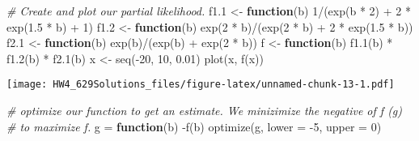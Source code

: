 \documentclass[
]{article}
\newenvironment{Shaded}{\begin{snugshade}}{\end{snugshade}}
\newcommand{\AttributeTok}[1]{\textcolor[rgb]{0.77,0.63,0.00}{#1}}
\newcommand{\CommentTok}[1]{\textcolor[rgb]{0.56,0.35,0.01}{\textit{#1}}}
\newcommand{\ControlFlowTok}[1]{\textcolor[rgb]{0.13,0.29,0.53}{\textbf{#1}}}
\newcommand{\DecValTok}[1]{\textcolor[rgb]{0.00,0.00,0.81}{#1}}
\newcommand{\FloatTok}[1]{\textcolor[rgb]{0.00,0.00,0.81}{#1}}
\newcommand{\FunctionTok}[1]{\textcolor[rgb]{0.00,0.00,0.00}{#1}}
\newcommand{\NormalTok}[1]{#1}
\newcommand{\OtherTok}[1]{\textcolor[rgb]{0.56,0.35,0.01}{#1}}
\newcommand{\SpecialCharTok}[1]{\textcolor[rgb]{0.00,0.00,0.00}{#1}}
\begin{document}
\begin{Shaded}
\begin{Highlighting}[]
\CommentTok{\# Create and plot our partial likelihood.}
\NormalTok{f1}\FloatTok{.1} \OtherTok{\textless{}{-}} \ControlFlowTok{function}\NormalTok{(b) }\DecValTok{1}\SpecialCharTok{/}\NormalTok{(}\FunctionTok{exp}\NormalTok{(b }\SpecialCharTok{*} \DecValTok{2}\NormalTok{) }\SpecialCharTok{+} \DecValTok{2} \SpecialCharTok{*} \FunctionTok{exp}\NormalTok{(}\FloatTok{1.5} \SpecialCharTok{*}\NormalTok{ b) }\SpecialCharTok{+} \DecValTok{1}\NormalTok{)}
\NormalTok{f1}\FloatTok{.2} \OtherTok{\textless{}{-}} \ControlFlowTok{function}\NormalTok{(b) }\FunctionTok{exp}\NormalTok{(}\DecValTok{2} \SpecialCharTok{*}\NormalTok{ b)}\SpecialCharTok{/}\NormalTok{(}\FunctionTok{exp}\NormalTok{(}\DecValTok{2} \SpecialCharTok{*}\NormalTok{ b) }\SpecialCharTok{+} \DecValTok{2} \SpecialCharTok{*} \FunctionTok{exp}\NormalTok{(}\FloatTok{1.5} \SpecialCharTok{*}\NormalTok{ b))}
\NormalTok{f2}\FloatTok{.1} \OtherTok{\textless{}{-}} \ControlFlowTok{function}\NormalTok{(b) }\FunctionTok{exp}\NormalTok{(b)}\SpecialCharTok{/}\NormalTok{(}\FunctionTok{exp}\NormalTok{(b) }\SpecialCharTok{+} \FunctionTok{exp}\NormalTok{(}\DecValTok{2} \SpecialCharTok{*}\NormalTok{ b))}
\NormalTok{f }\OtherTok{\textless{}{-}} \ControlFlowTok{function}\NormalTok{(b) }\FunctionTok{f1.1}\NormalTok{(b) }\SpecialCharTok{*} \FunctionTok{f1.2}\NormalTok{(b) }\SpecialCharTok{*} \FunctionTok{f2.1}\NormalTok{(b)}
\NormalTok{x }\OtherTok{\textless{}{-}} \FunctionTok{seq}\NormalTok{(}\SpecialCharTok{{-}}\DecValTok{20}\NormalTok{, }\DecValTok{10}\NormalTok{, }\FloatTok{0.01}\NormalTok{)}
\FunctionTok{plot}\NormalTok{(x, }\FunctionTok{f}\NormalTok{(x))}
\end{Highlighting}
\end{Shaded}

\texttt{[image: HW4\_629Solutions\_files/figure-latex/unnamed-chunk-13-1.pdf]}

\begin{Shaded}
\begin{Highlighting}[]
\CommentTok{\# optimize our function to get an estimate. We minizimize the negative of f (g)}
\CommentTok{\# to maximize f.}
\NormalTok{g }\OtherTok{=} \ControlFlowTok{function}\NormalTok{(b) }\SpecialCharTok{{-}}\FunctionTok{f}\NormalTok{(b)}
\FunctionTok{optimize}\NormalTok{(g, }\AttributeTok{lower =} \SpecialCharTok{{-}}\DecValTok{5}\NormalTok{, }\AttributeTok{upper =} \DecValTok{0}\NormalTok{)}
\end{Highlighting}
\end{Shaded}
\end{document}

